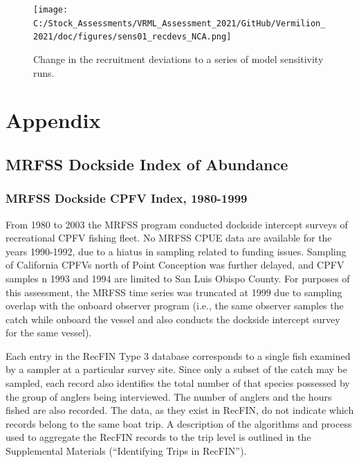 \documentclass[
  english,
  a4paper,
]{article}
\begin{document}
\begin{figure}
\centering
\texttt{[image: C:/Stock\_Assessments/VRML\_Assessment\_2021/GitHub/Vermilion\_2021/doc/figures/sens01\_recdevs\_NCA.png]}
\caption{Change in the recruitment deviations to a series of model sensitivity runs.\label{fig:sens1-recdev}}
\end{figure}

\clearpage

\hypertarget{appendix}{%
\section{Appendix}\label{appendix}}

\hypertarget{mrfss-index}{%
\subsection{MRFSS Dockside Index of Abundance}\label{mrfss-index}}

\hypertarget{mrfss-dockside-cpfv-index-1980-1999}{%
\subsubsection{MRFSS Dockside CPFV Index, 1980-1999}\label{mrfss-dockside-cpfv-index-1980-1999}}

From 1980 to 2003 the MRFSS program conducted dockside intercept surveys of
recreational CPFV fishing fleet. No MRFSS CPUE data are available for the years
1990-1992, due to a hiatus in sampling related to funding issues. Sampling of
California CPFVs north of Point Conception was further delayed, and CPFV samples
n 1993 and 1994 are limited to San Luis Obispo County.
For purposes of this assessment, the MRFSS time series was truncated at 1999 due
to sampling overlap with the
onboard observer program (i.e., the same observer samples the catch while
onboard the vessel and also conducts the dockside intercept survey for
the same vessel).

Each entry in the RecFIN Type 3 database corresponds to a
single fish examined by a sampler at a particular survey site. Since only a
subset of the catch may be sampled, each record also
identifies the total number of that species possessed by the group of anglers
being interviewed. The number of anglers and the hours fished are also recorded.
The data, as they exist in RecFIN, do not indicate which records
belong to the same boat trip. A description of the algorithms and process used to
aggregate the RecFIN records to the trip level is outlined in the Supplemental Materials
(``Identifying Trips in RecFIN'').
\end{document}
